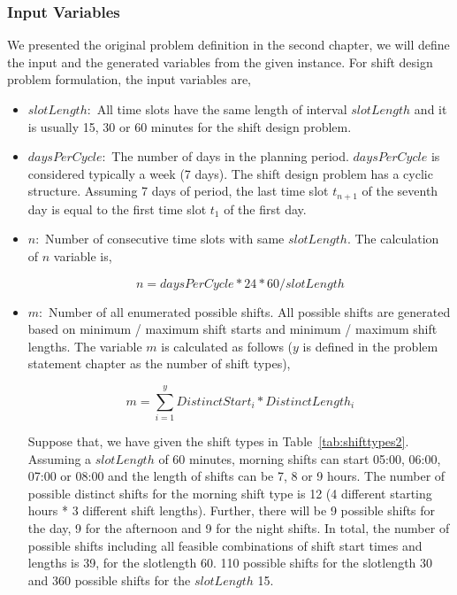 \subsubsection{Input Variables}

We presented the original problem definition in the second chapter, we will define the input and the generated variables from the given instance. For shift design problem formulation, the input variables are, \\

\begin{itemize}
\item $slotLength :$ All time slots have the same length of interval $slotLength$ and it is usually 15, 30 or 60 minutes for the shift design problem.

\item $daysPerCycle :$ The number of days in the planning period. $daysPerCycle$ is considered typically a week (7 days).
The shift design problem has a cyclic structure. Assuming 7 days of period, the last time slot $t_{n+1}$ of the seventh day is equal to the first time slot $t_1$ of the first day. 

\item $n :$ Number of consecutive time slots with same $slotLength$. The calculation of $n$ variable is,

\begin{equation}
 n = daysPerCycle * 24 *  60 / slotLength
\end{equation}

\item $m :$ Number of all enumerated possible shifts. All possible shifts are generated based on minimum / maximum shift starts and minimum / maximum shift lengths. The variable $m$ is calculated as follows ($y$ is defined in the problem statement chapter as the number of shift types),

\begin{equation}
m = \sum_{i=1}^y Distinct Start_i * Distinct Length_i
\end{equation}

Suppose that, we have given the shift types in Table~\ref{tab:shifttypes2}. Assuming a $slotLength$ of 60 minutes, morning shifts can start  05:00, 06:00, 07:00 or 08:00 and the length of shifts can be 7, 8 or 9 hours. The number of possible distinct shifts for the morning shift type is 12 (4 different starting hours * 3 different shift lengths). Further, there will be 9 possible shifts for the day, 9 for the afternoon and 9 for the night shifts. In total, the number of possible shifts including all feasible combinations of shift start times and lengths is 39, for the slotlength 60. 110 possible shifts for the slotlength 30 and 360 possible shifts for the $slotLength$ 15. \\


\end{itemize}
